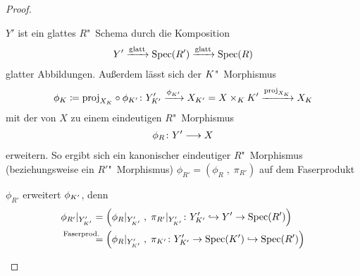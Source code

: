 \begin{Satz}
\begin{proof}
\begin{enumerate}[resume*,start=1]
\begin{description}
        $Y'$ ist ein glattes $R$"~Schema durch die Komposition
        \begin{gather*}
          Y'\xrightarrow{\text{glatt}}\operatorname{Spec}(R')
          \xrightarrow{\text{glatt}}\operatorname{Spec}(R)
        \end{gather*}
        glatter Abbildungen.
        Außerdem lässt sich der $K$"~Morphismus
        \begin{gather*}
          \phi_{K} \coloneqq \text{proj}_{X_{K}}\circ\phi_{K'}
          \colon
          Y_{K'}' \xrightarrow{\phi_{K'}} X_{K'}=X\times_{K}K'
          \xrightarrow{\text{proj}_{X_{K}}} X_{K}
        \end{gather*}
        mit der \NAbbEig von $X$ zu einem eindeutigen
        $R$"~Morphismus
        \begin{gather*}
          \phi_R\colon Y'\longrightarrow X
        \end{gather*}
        erweitern.
        So ergibt sich ein kanonischer eindeutiger $R$"~Morphismus
        (beziehungsweise ein $R'$"~Morphismus)
        $\phi_{R'} = (\phi_R\;,\;\pi_{R'})$ auf dem Faserprodukt 
        \begin{center}
        \end{center}
        $\phi_{R'}$ erweitert $\phi_{K'}$, denn
        \begin{align*}
          \phi_{R'}|_{Y_{\K'}'}
          &= \left(
            \phi_R|_{Y_{\K'}'}\;,\;
            \pi_{R'}|_{Y_{\K'}'}\colon
            Y_{\K'}'\hookrightarrow Y'\to\Spec(R')
            \right)\\
          &\overset{\mathllap{\text{Faserprod.}}}{=} \left(
            \phi_R|_{Y_{\K'}'}\;,\;
            \pi_{\K'}\colon
            Y_{\K'}'\to \Spec(K')\hookrightarrow\Spec(R')
            \right)\\

\end{align*}
\end{description}
\end{enumerate}
\end{proof}
\end{Satz}
